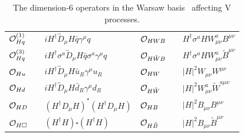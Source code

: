 \documentclass[a4paper,11pt]{article}
\renewcommand{\PV}{{{{V}}}\xspace}
\newcommand{\VH}{{{\PV}{\PH}}\xspace}
\begin{document}
\begin{table}[tph]
\caption{
The dimension-6 operators in the Warsaw basis~\cite{Grzadkowski:2010es} affecting \VH  processes.
}
\begin{center}
{\renewcommand{\arraystretch}{1.3}
\begin{tabular}{lcl|lcl}
${\cal O}^{(1)}_{Hq}$&&$i H^\dagger \overleftrightarrow{D}_\mu H \bar{q}   \gamma^\mu q$&${\cal O}_{HWB}$&&$ H^\dagger \sigma^a H W^a_{\mu\nu}B^{\mu\nu}$ \\
\rule{0pt}{4ex} ${\cal O}^{(3)}_{Hq}$&&$i H^\dagger \sigma^a \overleftrightarrow{D}_\mu H \bar{q}  \sigma^a \gamma^\mu q$ &${\cal O}_{H\tilde{W}B}$&&$ H^\dagger \sigma^a H W^a_{\mu\nu}\tilde{B}^{\mu\nu}$\\
\rule{0pt}{4ex} ${\cal O}_{Hu}$&&$i H^\dagger \overleftrightarrow{D}_\mu H \bar{u}_R  \gamma^\mu u_R$&${\cal O}_{H{W}}$&&$ |H|^2 W_{\mu\nu}{W}^{\mu\nu}$\\
\rule{0pt}{4ex} ${\cal O}_{Hd}$&&$i H^\dagger \overleftrightarrow{D}_\mu H \bar{d}_R  \gamma^\mu d_R$&${\cal O}_{H\tilde{W}}$&&$ |H|^2 W^a_{\mu\nu}\tilde{W}^{a \mu\nu}$\\
\rule{0pt}{4ex} ${\cal O}_{HD}$&&$(H^\dagger  {D}_\mu H)^*(H^\dagger  {D}_\mu H)$& ${\cal O}_{HB}$&&$|H|^2 B_{\mu\nu}B^{\mu\nu}$\\
\rule{0pt}{4ex} ${\cal O}_{H\square}$&&$(H^\dagger H) \square (H^\dagger H)$& ${\cal O}_{H\tilde{B}}$&&$|H|^2 B_{\mu\nu}\tilde{B}^{\mu\nu}$
\end{tabular}}
\label{Tab:Operators}
\end{center}
\end{table}
\end{document}
